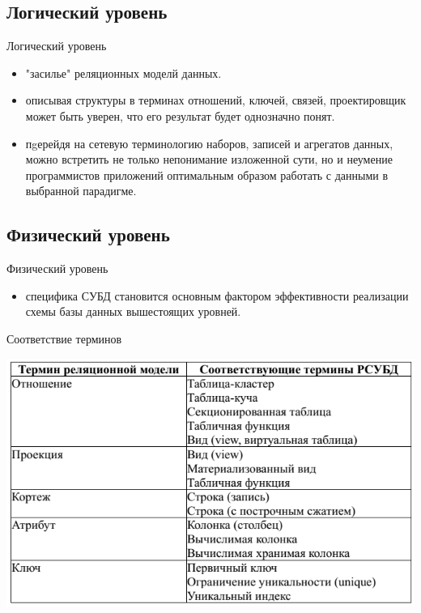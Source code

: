 \documentclass{beamer}
\begin{document}
\subsection{Логический уровень}
\begin{frame}
\begin{block}{Логический уровень}
\begin{itemize}
\item "засилье" реляционных моделй данных.
\item описывая структуры в терминах отношений, ключей, связей, проектировщик может быть уверен, что его результат будет однозначно понят.
\item пgерейдя на сетевую терминологию наборов, записей и агрегатов данных, можно встретить не только непонимание изложенной сути, но и неумение программистов приложений оптимальным
образом работать с данными в выбранной парадигме.
\end{itemize}
\end{block}
\end{frame} 

\subsection{Физический уровень}
\begin{frame}
\begin{block}{Физический уровень}
\begin{itemize}
\item специфика СУБД становится основным фактором эффективности реализации схемы базы данных
вышестоящих уровней.
\end{itemize}
\end{block}
\begin{block}{Соответствие терминов}
\begin{center}
\includegraphics[scale=0.5]{images/rel-dbms.png}
\end{center}
\end{block}
\end{frame} 
\end{document}
